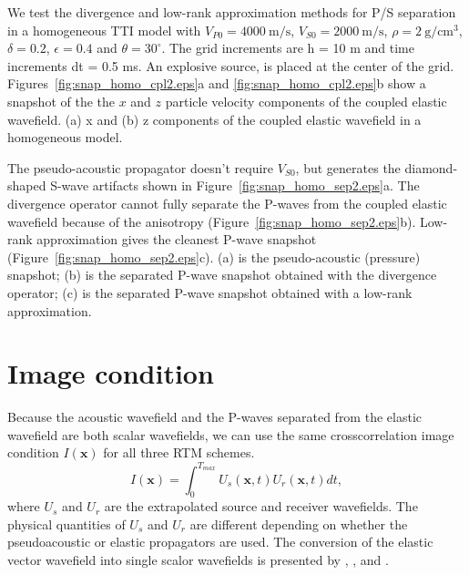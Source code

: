 \documentclass[manuscript,ulem,graphix,revised]{geophysics}
\begin{document}
We test the divergence and low-rank approximation methods for P/S separation in a homogeneous TTI model with $V_{P0}=4000~\mathrm{m/s}$, $V_{S0}=2000~\mathrm{m/s}$, $\rho=2~\mathrm{g/cm^3}$, $\delta=0.2$, $\epsilon=0.4$ and $\theta=30^\circ$. 
The grid increments are h = 10 m and time increments dt = 0.5 ms. 
An explosive source, is placed at the center of the grid. 
Figures~\ref{fig:snap_homo_cpl2.eps}a and \ref{fig:snap_homo_cpl2.eps}b show a snapshot of the the $x$ and $z$ particle velocity components of the coupled elastic wavefield.
{
(a) x and (b) z components of the coupled elastic wavefield in a homogeneous model.
}

The pseudo-acoustic propagator doesn't require $V_{S0}$, but generates the diamond-shaped S-wave artifacts \citep{alkhalifah00,grechka04} \marginnote{[21,5]}shown in Figure~\ref{fig:snap_homo_sep2.eps}a. The divergence operator cannot fully separate the P-waves from the coupled elastic wavefield because of the anisotropy (Figure~\ref{fig:snap_homo_sep2.eps}b). Low-rank approximation gives the cleanest P-wave snapshot (Figure~\ref{fig:snap_homo_sep2.eps}c). 
{
(a) is the pseudo-acoustic (pressure) snapshot; (b) is the separated P-wave snapshot obtained with the divergence operator; (c) is the separated P-wave snapshot obtained with a low-rank approximation.
}

\section{Image condition}
\indent\indent
Because the acoustic wavefield and the P-waves separated from the elastic wavefield are both scalar wavefields, we can use the same crosscorrelation image condition $I(\boldsymbol{x})$ for all three RTM schemes.\marginnote{[11,12]}
\begin{equation}
I(\boldsymbol{x})=\int_{0}^{T_{max}}U_s(\boldsymbol{x},t)U_r(\boldsymbol{x},t)dt,
\label{eqn:image_cdt}
\end{equation}
where $U_s$ and $U_r$ are the extrapolated source and receiver wavefields. The physical quantities of $U_s$ and $U_r$ are different depending on whether the pseudoacoustic or elastic propagators are used. The conversion of the elastic vector wavefield into single scalor wavefields is presented by \citet{sun06}, \citep{wenlong15b},\citep{ting16} and \citep{tang17}. \marginnote{[15]}
\end{document}
